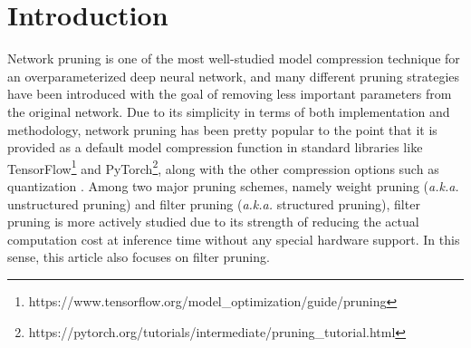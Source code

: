 \section{Introduction} \label{sec:intro}


Network pruning is one of the most well-studied model compression technique for an overparameterized deep neural network, and many different pruning strategies have been introduced with the goal of removing less important parameters from the original network. Due to its simplicity in terms of both implementation and methodology, network pruning has been pretty popular to the point that it is provided as a default model compression function in standard libraries like TensorFlow\footnote{https://www.tensorflow.org/model\_optimization/guide/pruning} and PyTorch\footnote{https://pytorch.org/tutorials/intermediate/pruning\_tutorial.html}, along with the other compression options such as quantization \cite{Coreset}. Among two major pruning schemes, namely weight pruning (\textit{a.k.a.} unstructured pruning) \cite{Lottery,Songhan,SNIP,Synaptic,OptimalPruning,SparseNet} and filter pruning (\textit{a.k.a.} structured pruning), filter pruning is more actively studied \cite{FPGM,Lasso,EagleEye,Rethinking,Thinet,DCP} due to its strength of reducing the actual computation cost at inference time without any special hardware support. In this sense, this article also focuses on filter pruning.



